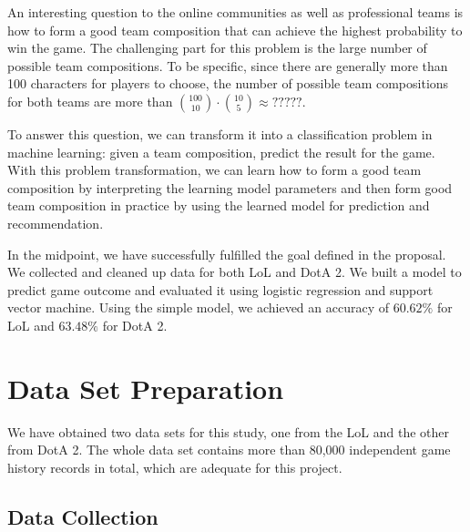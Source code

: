 \documentclass{article} %
\begin{document}
An interesting question to the online communities as well as professional teams is how to form a good team composition that can achieve the highest probability to win the game. The challenging part for this problem is the large number of possible team compositions. To be specific, since there are generally more than 100 characters for players
to choose, the number of possible team compositions for both teams are more than $\binom{100}{10}\cdot\binom{10}{5}\approx ?????$.


To answer this question, we can transform it into a classification problem in machine learning: given a team composition, predict the result for the game. With this problem transformation, we can learn how to form a good team composition by interpreting the learning model parameters and then form good team composition in practice by using the learned model for prediction and recommendation.

In the midpoint, we have successfully fulfilled the goal defined in the proposal.
We collected and cleaned up data for both LoL and DotA 2.
We built a model to predict game outcome and evaluated it using logistic regression and support vector machine.
Using the simple model, we achieved an accuracy of $60.62\%$ for LoL and $63.48\%$ for DotA 2.



\section{Data Set Preparation}
We have obtained two data sets for this study, one from the LoL and the other from DotA 2. The whole data set contains more than 80,000 independent game history records in total, which are adequate for this project.

\subsection{Data Collection}
\end{document}
